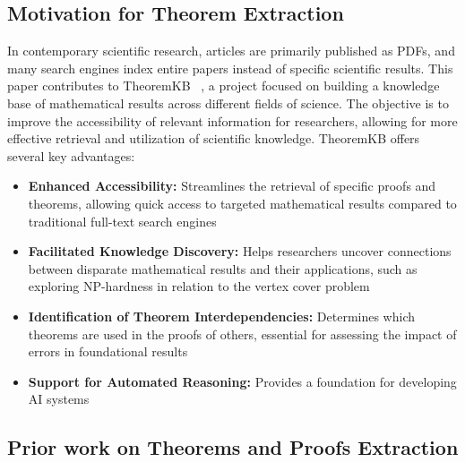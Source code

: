 \documentclass[runningheads]{llncs}
\begin{document}
\subsection{Motivation for Theorem Extraction}
In contemporary scientific research, articles are primarily published as PDFs, and many 
search engines index entire papers instead of specific scientific results. This paper 
contributes to TheoremKB ~\cite{doceng_paper}, a project focused on building a knowledge base of mathematical 
results across different fields of science. The objective is to improve the accessibility of 
relevant information for researchers, allowing for more effective retrieval and utilization 
of scientific knowledge. TheoremKB offers several key advantages:
\begin{itemize}
    \item \textbf{Enhanced Accessibility:} Streamlines the retrieval of specific proofs and theorems, allowing quick access to targeted mathematical results compared to traditional full-text search engines
    
    \item \textbf{Facilitated Knowledge Discovery:} Helps researchers uncover connections between disparate mathematical results and their applications, such as exploring NP-hardness in relation to the vertex cover problem
    
    \item \textbf{Identification of Theorem Interdependencies:} Determines which theorems are used in the proofs of others, essential for assessing the impact of errors in foundational results
    
    \item \textbf{Support for Automated Reasoning:} Provides a foundation for developing AI systems
\end{itemize}

\subsection{Prior work on Theorems and Proofs Extraction}
\end{document}
